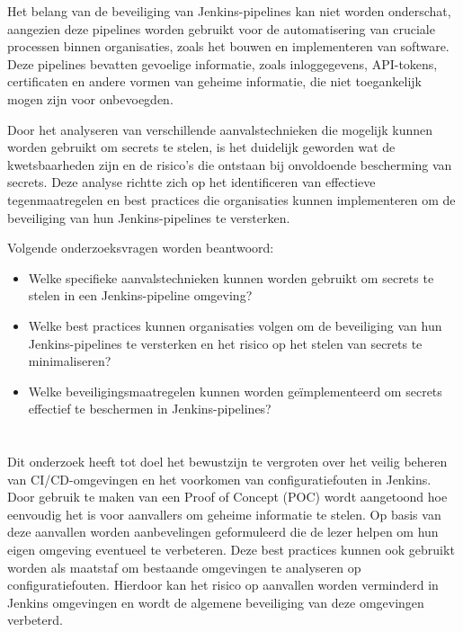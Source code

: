 Het belang van de beveiliging van Jenkins-pipelines kan niet worden onderschat, aangezien deze pipelines worden gebruikt voor de automatisering van cruciale processen binnen organisaties, zoals het bouwen en implementeren van software. Deze pipelines bevatten gevoelige informatie, zoals inloggegevens, API-tokens, certificaten en andere vormen van geheime informatie, die niet toegankelijk mogen zijn voor onbevoegden.
\newline

Door het analyseren van verschillende aanvalstechnieken die mogelijk kunnen worden gebruikt om secrets te stelen, is het duidelijk geworden wat de kwetsbaarheden zijn en de risico's die ontstaan bij onvoldoende bescherming van secrets. Deze analyse richtte zich op het identificeren van effectieve tegenmaatregelen en best practices die organisaties kunnen implementeren om de beveiliging van hun Jenkins-pipelines te versterken.
\newline

Volgende onderzoeksvragen worden beantwoord:

\begin{itemize}
  \item Welke specifieke aanvalstechnieken kunnen worden gebruikt om secrets te stelen in een Jenkins-pipeline omgeving?
  \item Welke best practices kunnen organisaties volgen om de beveiliging van hun Jenkins-pipelines te versterken en het risico op het stelen van secrets te minimaliseren?
  \item Welke beveiligingsmaatregelen kunnen worden geïmplementeerd om secrets effectief te beschermen in Jenkins-pipelines?
\end{itemize}

\section{}%
\label{sec:onderzoeksdoelstelling}
 
Dit onderzoek heeft tot doel het bewustzijn te vergroten over het veilig beheren van CI/CD-omgevingen en het voorkomen van configuratiefouten in Jenkins. Door gebruik te maken van een Proof of Concept (POC) wordt aangetoond hoe eenvoudig het is voor aanvallers om geheime informatie te stelen. Op basis van deze aanvallen worden aanbevelingen geformuleerd die de lezer helpen om hun eigen omgeving eventueel te verbeteren. Deze best practices kunnen ook gebruikt worden als maatstaf om bestaande omgevingen te analyseren op configuratiefouten. Hierdoor kan het risico op aanvallen worden verminderd in Jenkins omgevingen en wordt de algemene beveiliging van deze omgevingen verbeterd.
\clearpage 

